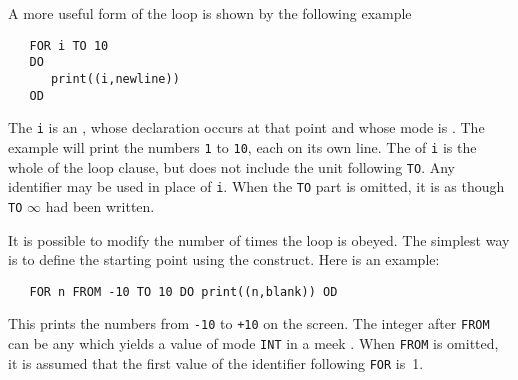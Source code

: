 A more useful form of the loop  is shown
by the following example
\begin{verbatim}
   FOR i TO 10
   DO
      print((i,newline))
   OD
\end{verbatim}
\noindent
The \verb|i| is an , whose declaration occurs at that
point and whose mode is .  The example will print the
numbers \verb|1| to \verb|10|, each on its own line.  The  of
\verb|i| is the whole of the loop clause, but does not include the
unit following \verb|TO|.  Any identifier may be used in place of
\verb|i|. When the \verb|TO| part is omitted, it is as though
\verb|TO| $\infty$ had been written.

It is possible to modify the number of times the loop is obeyed. The
simplest way is to define the starting point using the 
construct. Here is an example:
\begin{verbatim}
   FOR n FROM -10 TO 10 DO print((n,blank)) OD
\end{verbatim}
\noindent
This prints the numbers from \verb|-10| to \verb|+10| on the screen.
The integer after \verb|FROM| can be any  which yields a
value of mode \verb|INT| in a meek .
When \verb|FROM| is omitted, it is assumed that the first value of
the identifier following \verb|FOR| is~1.

